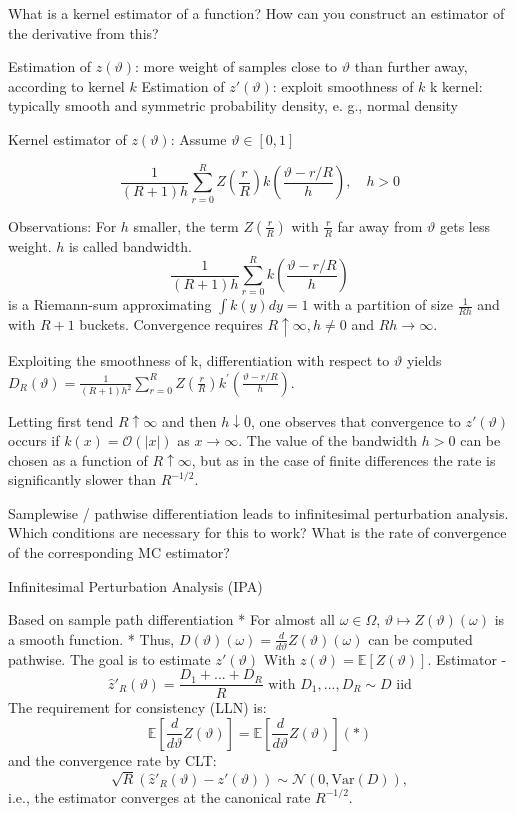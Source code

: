 What is a kernel estimator of a function? How can you construct an estimator of
the derivative from this?

Estimation of \(z(\vartheta)\): more weight of samples close to \(\vartheta\) than further away, according to kernel \(k\)
Estimation of \(z'(\vartheta)\): exploit smoothness of \(k\)
k kernel: typically smooth and symmetric probability density,
e. g., normal density

Kernel estimator of  \(z(\vartheta)\): Assume \(\vartheta \in [0,1]\)

\[ \frac{1}{(R+1)h} \sum_{r=0}^{R} Z \left( \frac{r}{R} \right) k \left( \frac{\vartheta - r/R}{h} \right), \quad h > 0 \]

Observations:
For \(h\) smaller, the term \(Z \left( \frac{r}{R} \right)\) with \(\frac{r}{R}\) far away from \(\vartheta\) gets less weight. \(h\) is called bandwidth.
\[ \frac{1}{(R+1)h} \sum_{r=0}^{R} k \left( \frac{\vartheta - r/R}{h} \right) \]
is a Riemann-sum approximating \(\int k(y) dy = 1\) with a partition of size \(\frac{1}{Rh}\) and with \(R+1\) buckets.
Convergence requires \(R \uparrow \infty, h \neq 0\) and \(Rh \rightarrow \infty\). 

Exploiting the smoothness of k, differentiation with respect to \(\vartheta\) yields
\(D_{R}(\vartheta)=\frac{1}{(R+1)h^{2}}\sum_{r=0}^{R}Z \left( \frac{r}{R} \right) k^{\prime} \left( \frac{\vartheta - r/R}{h} \right). \)

Letting first tend \(R \uparrow \infty\) and then \(h \downarrow 0\), 
one observes that convergence to \(z'(\vartheta)\) occurs if \(k(x) = \mathcal{O}(|x|)\) as 
\(x \rightarrow \infty\).
The value of the bandwidth \(h > 0\) can be chosen as a function of \(R \uparrow \infty\), but as in the case of finite differences the rate is significantly slower than \(R^{-1/2}\). 


Samplewise / pathwise differentiation leads to infinitesimal perturbation analysis.
Which conditions are necessary for this to work? What is the rate of convergence
of the corresponding MC estimator?

Infinitesimal Perturbation Analysis (IPA)

Based on sample path differentiation
* For almost all \(\omega \in \Omega\), \(\vartheta \mapsto Z(\vartheta)(\omega)\) is a smooth function.
* Thus, \(D(\vartheta)(\omega) = \frac{d}{d\vartheta} Z(\vartheta)(\omega)\) can be computed pathwise.
The goal is to estimate \(z'(\vartheta)\) With \(z(\vartheta) = \mathbb{E}[Z(\vartheta)]\).
Estimator - 
\[
\hat{z}'_R(\vartheta) = \frac{D_1 + ... + D_R}{R} \text{ with } D_1, ..., D_R \sim D \text{ iid}
\]
The requirement for consistency (LLN) is:
\[\mathbb{E} \left[ \frac{d}{d\vartheta} Z(\vartheta) \right] = \mathbb{E} \left[ \frac{d}{d\vartheta} Z(\vartheta) \right] (*)\]
and the convergence rate by CLT:
\[\sqrt{R} (\hat{z}'_R(\vartheta) - z'(\vartheta)) \sim \mathcal{N}(0, \text{Var}(D)),\]
i.e., the estimator converges at the canonical rate \(R^{-1/2}\). 

